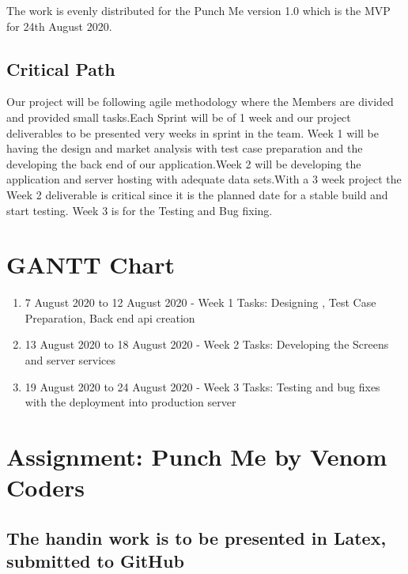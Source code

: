 \documentclass[16pt]{article}
\begin{document}
The work is evenly distributed for the Punch Me version 1.0 which is the MVP for  24th August 2020.

\subsection   {Critical Path}
Our project will be following agile methodology where the Members are divided and provided small tasks.Each Sprint will be of 1 week and our project deliverables to be presented very weeks in sprint in the team. Week 1 will be having the design and market analysis with test case preparation and the developing the back end of our application.Week 2 will be developing the application and server hosting with adequate data sets.With a 3 week project the Week 2 deliverable is critical since it is the planned date for a stable build and start testing. Week 3 is for the Testing and Bug fixing.

\section * {GANTT Chart}




\begin{enumerate}

    \item 7 August 2020 to 12 August 2020 - Week 1
Tasks: Designing , Test Case Preparation, Back end api creation

    \item 13 August 2020 to 18 August 2020 - Week 2
Tasks: Developing the Screens and server services

    





    \item 19 August 2020 to 24 August 2020 - Week 3
Tasks: Testing and bug fixes with the deployment into production server

\end{enumerate}

  

\section{Assignment: Punch Me by Venom Coders}  

\subsection{The handin work is to be presented in Latex, submitted to GitHub}
\end{document}
